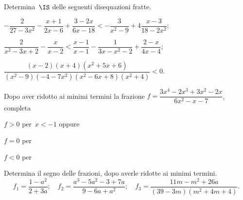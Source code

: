 \begin{esercizio}[\Ast]
\label{ese:20.64}
Determina~$\IS$ delle seguenti disequazioni fratte.

\begin{enumeratea}
 \item $-{\dfrac{2}{27-3x^{2}}}-\dfrac{x+1}{2x-6}+\dfrac{3-2x}{6x-18}<-{\dfrac{3}{x^{2}-9}}+4\dfrac{x-3}{18-2x^{2}}$;
\item $\dfrac{2}{x^{2}-3x+2}-\dfrac{x}{x-2}<\dfrac{x-1}{x-1}-\dfrac{1}{3x-x^{2}-2}+\dfrac{2-x}{4x-4}$;
\item $\dfrac{(x-2)(x+4)(x^{2}+5x+6)}{(x^{2}-9)(-4-7x^{2})(x^{2}-6x+8)(x^{2}+4)}<0$.
\end{enumeratea}
\end{esercizio}
\pagebreak
\begin{esercizio}
\label{ese:20.65}
Dopo aver ridotto ai minimi termini la frazione
$f=\dfrac{3x^{4}-2x^{3}+3x^{2}-2x}{6x^{2}-x-7}$, completa

 \begin{enumeratea}
 \item $f>0$ per~$x<-1$ oppure \dotfill
 \item $f=0$ per \dotfill
 \item $f<0$ per \dotfill
 \end{enumeratea}
\end{esercizio}

\begin{esercizio}
\label{ese:20.66}
Determina il segno delle frazioni, dopo averle ridotte ai minimi termini.
\[f_{1}=\dfrac{1-a^{2}}{2+3a};\quad f_{2}=\dfrac{a^{3}-5a^{2}-3+7a}{9-6a+a^{2}};\quad f_{3}=\dfrac{11m-m^{2}+26a}{(39-3m)(m^{2}+4m+4)}.\]
\end{esercizio}

